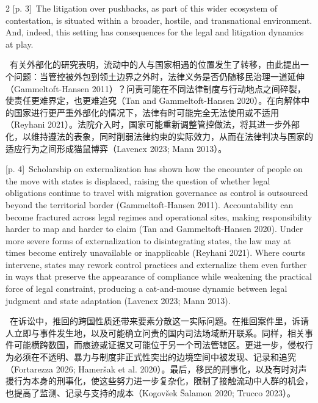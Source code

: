 \documentclass[10pt,a4paper]{article}
\begin{document}
\begin{paracol}{2}
\switchcolumn
{\scriptsize\color{gray} [p. 3]}\ The litigation over pushbacks, as part of this wider ecosystem of contestation, is situated within a broader, hostile, and transnational environment. And, indeed, this setting has consequences for the legal and litigation dynamics at play.\par
\switchcolumn*
{\scriptsize\color{gray} [p. 4]}\ 有关外部化的研究表明，流动中的人与国家相遇的位置发生了转移，由此提出一个问题：当管控被外包到领土边界之外时，法律义务是否仍随移民治理一道延伸（Gammeltoft-Hansen 2011）？问责可能在不同法律制度与行动地点之间碎裂，使责任更难界定，也更难追究（Tan and Gammeltoft-Hansen 2020）。在向解体中的国家进行更严重外部化的情况下，法律有时可能完全无法使用或不适用（Reyhani 2021）。法院介入时，国家可能重新调整管控做法，将其进一步外部化，以维持遵法的表象，同时削弱法律约束的实际效力，从而在法律判决与国家的适应行为之间形成猫鼠博弈（Lavenex 2023; Mann 2013）。\par
\switchcolumn
{\scriptsize\color{gray} [p. 4]}\ Scholarship on externalization has shown how the encounter of people on the move with states is displaced, raising the question of whether legal obligations continue to travel with migration governance as control is outsourced beyond the territorial border (Gammeltoft-Hansen 2011). Accountability can become fractured across legal regimes and operational sites, making responsibility harder to map and harder to claim (Tan and Gammeltoft-Hansen 2020). Under more severe forms of externalization to disintegrating states, the law may at times become entirely unavailable or inapplicable (Reyhani 2021). Where courts intervene, states may rework control practices and externalize them even further in ways that preserve the appearance of compliance while weakening the practical force of legal constraint, producing a cat-and-mouse dynamic between legal judgment and state adaptation (Lavenex 2023; Mann 2013).\par
\switchcolumn*
{\scriptsize\color{gray} [p. 4]}\ 在诉讼中，推回的跨国性质还带来要素分散这一实际问题。在推回案件里，诉请人立即与事件发生地，以及可能确立问责的国内司法场域断开联系。同样，相关事件可能横跨数国，而痕迹或证据又可能位于另一个司法管辖区。更进一步，侵权行为必须在不透明、暴力与制度非正式性突出的边境空间中被发现、记录和追究（Fortarezza 2026; Hameršak et al. 2020）。最后，移民的刑事化，以及有时对声援行为本身的刑事化，使这些努力进一步复杂化，限制了接触流动中人群的机会，也提高了监测、记录与支持的成本（Kogovšek Šalamon 2020; Trucco 2023）。\par
\switchcolumn

\end{paracol}
\end{document}
